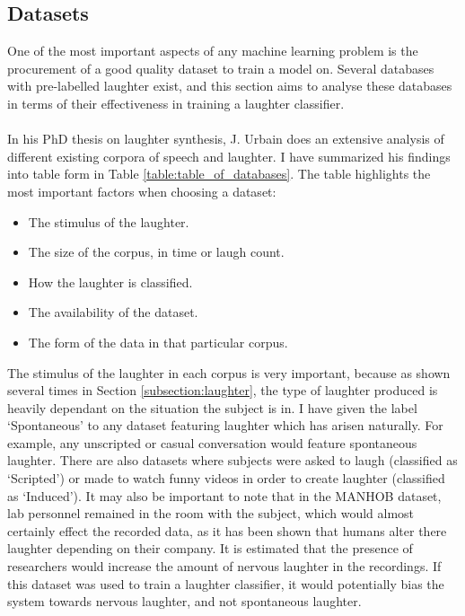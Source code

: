 \documentclass[a4paper,11pt,notitlepage]{article}
\begin{document}
\newpage

\subsection{Datasets}

One of the most important aspects of any machine learning problem is the procurement of a good quality dataset to train a model on. Several databases with pre-labelled laughter exist, and this section aims to analyse these databases in terms of their effectiveness in training a laughter classifier.\\
\\
In his PhD thesis on laughter synthesis\cite{dupont2014acoustic}, J. Urbain does an extensive analysis of different existing corpora of speech and laughter. I have summarized his findings into table form in Table \ref{table:table_of_databases}. The table highlights the most important factors when choosing a dataset:
\begin{itemize}
\item The stimulus of the laughter.
\item The size of the corpus, in time or laugh count.
\item How the laughter is classified.
\item The availability of the dataset.
\item The form of the data in that particular corpus.
\end{itemize}
The stimulus of the laughter in each corpus is very important, because as shown several times in Section \ref{subsection:laughter}, the type of laughter produced is heavily dependant on the situation the subject is in. I have given the label `Spontaneous' to any dataset featuring laughter which has arisen naturally. For example, any unscripted or casual conversation would feature spontaneous laughter. There are also datasets where subjects were asked to laugh (classified as `Scripted') or made to watch funny videos in order to create laughter (classified as `Induced'). It may also be important to note that in the MANHOB dataset, lab personnel remained in the room with the subject, which would almost certainly effect the recorded data, as it has been shown that humans alter there laughter depending on their company.\cite{campbell2007whom} It is estimated that the presence of researchers would increase the amount of nervous laughter in the recordings. If this dataset was used to train a laughter classifier, it would potentially bias the system towards nervous laughter, and not spontaneous laughter.\\
\end{document}
